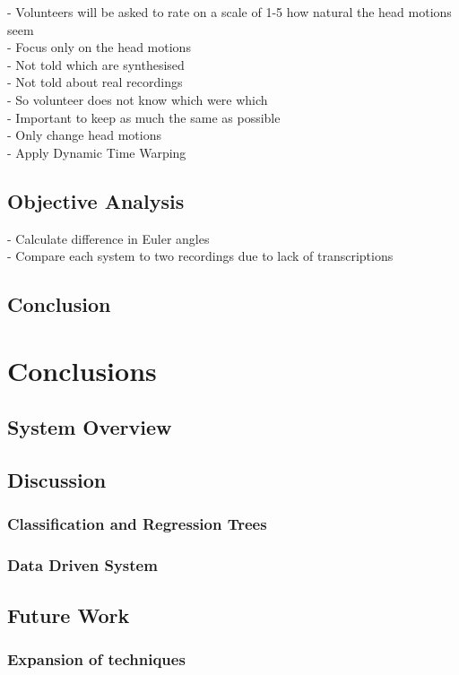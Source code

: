\documentclass[bsc,frontabs,twoside,singlespacing,parskip]{infthesis}
\begin{document}
- Volunteers will be asked to rate on a scale of 1-5 how natural the head motions seem \\
- Focus only on the head motions \\
- Not told which are synthesised\\
- Not told about real recordings \\
- So volunteer does not know which were which\\

- Important to keep as much the same as possible\\
- Only change head motions\\
- Apply Dynamic Time Warping\\ 

\section{Objective Analysis}

- Calculate difference in Euler angles\\
- Compare each system to two recordings due to lack of transcriptions\\

\section{Conclusion}
\chapter{Conclusions}

\section{System Overview}

\section{Discussion}
	\subsection{Classification and Regression Trees}
	\subsection{Data Driven System}
\section{Future Work}
	\subsection{Expansion of techniques}
	


\end{document}

